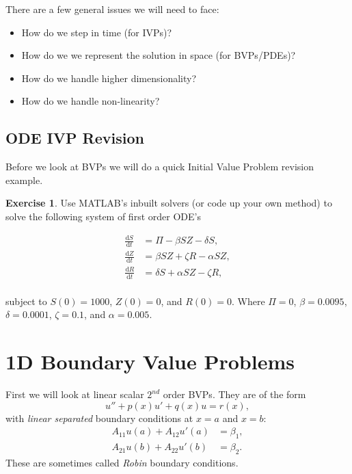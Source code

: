 \documentclass[12pt, a4paper]{article}
\theoremstyle{definition}
\newtheorem{exercise}[thm]{Exercise}
\theoremstyle{remark}
\numberwithin{equation}{section}
\newcommand{\dd}[2]{\frac{\textrm{d} #1}{\textrm{d} #2}}
\begin{document}
There are a few general issues we will need to face:
\begin{itemize}
 \item How do we step in time (for IVPs)?
\item How do we we represent the solution in space (for BVPs/PDEs)?
\item How do we handle higher dimensionality?
\item How do we handle non-linearity?
\end{itemize}

\newpage

\subsection{ODE IVP Revision}

Before we look at BVPs we will do a quick Initial Value Problem revision example.

\begin{exercise}
Use MATLAB's inbuilt solvers (or code up your own method) to solve the following system of first order ODE's

\begin{align*}
\dd{S}{t} &= \Pi - \beta S Z - \delta S, \\
\dd{Z}{t} &=  \beta S Z +\zeta R - \alpha S Z, \\
\dd{R}{t} &= \delta S + \alpha S Z- \zeta R, \\
\end{align*}
\end{exercise} 
subject to $S(0)=1000$, $Z(0)=0$, and $R(0)=0$. Where $\Pi=0$, $\beta=0.0095$, $\delta=0.0001$,  $\zeta=0.1$, and $\alpha=0.005$.



\newpage
\section{1D Boundary Value Problems}

First we will look at linear scalar $2^{nd}$ order BVPs.
They are of the form 
\begin{equation*}
u''+p(x)u'+q(x)u=r(x),
\end{equation*}
with \emph{linear separated} boundary conditions at $x=a$ and $x=b$:
\begin{align*}
A_{11}u(a)+A_{12}u'(a)&=\beta_1,\\
A_{21}u(b)+A_{22}u'(b)&=\beta_2.
\end{align*}
These are sometimes called \emph{Robin} boundary conditions.
\end{document}

